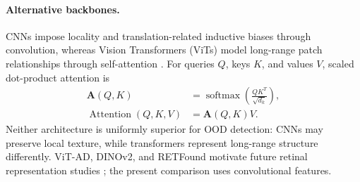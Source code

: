 \documentclass[fleqn,12pt]{olplainarticle}
\begin{document}
\paragraph{Alternative backbones.}
CNNs impose locality and translation-related inductive biases through convolution, whereas Vision Transformers (ViTs) model long-range patch relationships through self-attention \cite{dosovitskiy2020image}. For queries $Q$, keys $K$, and values $V$, scaled dot-product attention is
\begin{equation}
    \begin{aligned}
        \mathbf{A}(Q,K)
        &=\operatorname{softmax}\left(\frac{QK^T}{\sqrt{d_k}}\right),\\
        \operatorname{Attention}(Q,K,V)
        &=\mathbf{A}(Q,K)V.
    \end{aligned}
\end{equation}
Neither architecture is uniformly superior for OOD detection: CNNs may preserve local texture, while transformers represent long-range structure differently. ViT-AD, DINOv2, and RETFound motivate future retinal representation studies \cite{mishra2021vt,oquab2023dinov2,zhou2023retfound}; the present comparison uses convolutional features.
\end{document}
